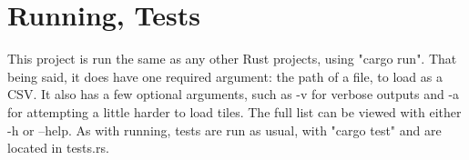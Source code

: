 \documentclass[11pt]{article}
\begin{document}
\section{Running, Tests}
This project is run the same as any other Rust projects, using "cargo run". That being said, it does have one required argument: the path of a file, to load as a CSV.
It also has a few optional arguments, such as -v for verbose outputs and -a for attempting a little harder to load tiles. The full list can be viewed with either -h or --help.
As with running, tests are run as usual, with "cargo test" and are located in tests.rs.
\end{document}
